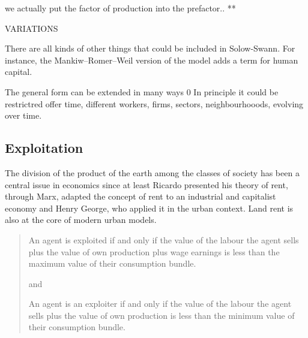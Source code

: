 we actually put the factor of production into the prefactor.. ** 





VARIATIONS

There are all kinds of other things that could be included in Solow-Swann. For instance, the Mankiw–Romer–Weil version of the model adds a term for human capital.

The general form can be extended in many ways 0 
 In principle it could be restrictred offer time, different workers, firms, sectors, neighbourhooods, evolving over time.


\subsection{Exploitation}\label{Sec:Exploitation: A Note}
The division of the product of the earth among the classes of society has been a central issue in economics since at least Ricardo presented his theory of  rent, through Marx, adapted the concept of rent to an industrial and capitalist economy and Henry George, who applied it in the urban context. Land rent is also at the core of modern urban models. 

\begin{quotation}

An agent is exploited  if and only if the value of the labour the agent sells plus the value of own production plus wage earnings is less than the maximum value of their consumption bundle.\vspace{.25cm}

and\vspace{.25cm}

An agent is an exploiter  if and only if the value of the labour the agent sells plus the value of own production is less than the minimum value of their consumption bundle.
\end{quotation}

